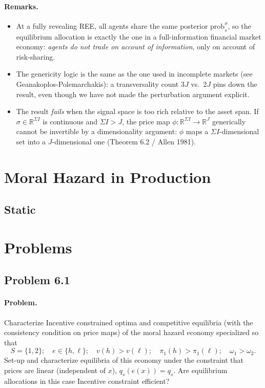 \paragraph{Remarks.}
\begin{itemize}
    \item At a fully revealing REE, all agents share the same posterior $\text{prob}^\sigma_s$, so the equilibrium allocation is exactly the one in a full-information financial market economy: \emph{agents do not trade on account of information}, only on account of risk-sharing.
    \item The genericity logic is the same as the one used in incomplete markets (see Geanakoplos-Polemarchakis): a transversality count $3J$ vs.\ $2J$ pins down the result, even though we have not made the perturbation argument explicit.
    \item The result \emph{fails} when the signal space is too rich relative to the asset span. If $\sigma \in \mathbb{R}^{\Sigma I}$ is continuous and $\Sigma I > J$, the price map $\phi: \mathbb{R}^{\Sigma I} \to \mathbb{R}^J$ generically cannot be invertible by a dimensionality argument: $\phi$ maps a $\Sigma I$-dimensional set into a $J$-dimensional one (Theorem 6.2 / Allen 1981).
\end{itemize}



\section{Moral Hazard in Production}
\subsection{Static}


\section{Problems}
\subsection{Problem 6.1}
\paragraph{Problem.} Characterize Incentive constrained optima and competitive equilibria (with the consistency condition on price maps) of the moral hazard economy specialized so that
\[
S = \{1, 2\}; \quad e \in \{h, \ell\}; \quad v(h) > v(\ell); \quad \pi_1(h) > \pi_1(\ell); \quad \omega_1 > \omega_2.
\]
Set-up and characterize equilibria of this economy under the constraint that prices are linear (independent of $x$), $q_s(e(x)) = q_s$. Are equilibrium allocations in this case Incentive constraint efficient?

